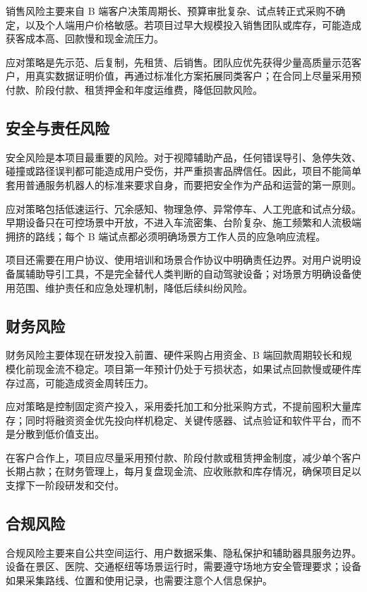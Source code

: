 \documentclass[a4paper,fontset=none]{ctexart}
\begin{document}
销售风险主要来自 B 端客户决策周期长、预算审批复杂、试点转正式采购不确定，以及个人端用户价格敏感。若项目过早大规模投入销售团队或库存，可能造成获客成本高、回款慢和现金流压力。

应对策略是先示范、后复制，先租赁、后销售。团队应优先获得少量高质量示范客户，用真实数据证明价值，再通过标准化方案拓展同类客户；在合同上尽量采用预付款、阶段付款、租赁押金和年度运维费，降低回款风险。

\subsection{安全与责任风险}

安全风险是本项目最重要的风险。对于视障辅助产品，任何错误导引、急停失效、碰撞或路径误判都可能造成用户受伤，并严重损害品牌信任。因此，项目不能简单套用普通服务机器人的标准来要求自身，而要把安全作为产品和运营的第一原则。

应对策略包括低速运行、冗余感知、物理急停、异常停车、人工兜底和试点分级。早期设备只在可控场景中开放，不进入车流密集、台阶复杂、施工频繁和人流极端拥挤的路线；每个 B 端试点都必须明确场景方工作人员的应急响应流程。

项目还需要在用户协议、使用培训和场景合作协议中明确责任边界。对用户说明设备属辅助导引工具，不是完全替代人类判断的自动驾驶设备；对场景方明确设备使用范围、维护责任和应急处理机制，降低后续纠纷风险。

\subsection{财务风险}

财务风险主要体现在研发投入前置、硬件采购占用资金、B 端回款周期较长和规模化前现金流不稳定。项目第一年预计仍处于亏损状态，如果试点回款慢或硬件库存过高，可能造成资金周转压力。

应对策略是控制固定资产投入，采用委托加工和分批采购方式，不提前囤积大量库存；同时将融资资金优先投向样机稳定、关键传感器、试点验证和软件平台，而不是分散到低价值支出。

在客户合作上，项目应尽量采用预付款、阶段付款或租赁押金制度，减少单个客户长期占款；在财务管理上，每月复盘现金流、应收账款和库存情况，确保项目足以支撑下一阶段研发和交付。

\subsection{合规风险}

合规风险主要来自公共空间运行、用户数据采集、隐私保护和辅助器具服务边界。设备在景区、医院、交通枢纽等场景运行时，需要遵守场地方安全管理要求；设备如果采集路线、位置和使用记录，也需要注意个人信息保护。
\end{document}
